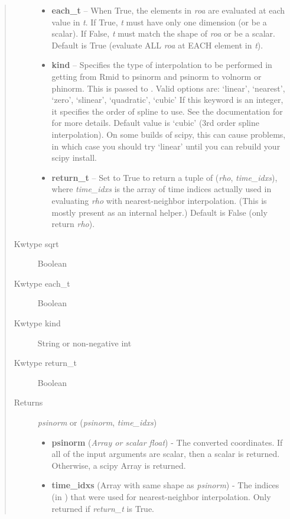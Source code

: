 \documentclass[letterpaper,10pt,english]{sphinxmanual}
\begin{document}
\begin{fulllineitems}
\begin{fulllineitems}
\begin{quote}
\begin{description}
\begin{itemize}
\item {} 
\textbf{each\_t} -- When True, the elements in \emph{roa} are evaluated
at each value in \emph{t}. If True, \emph{t} must have only one dimension
(or be a scalar). If False, \emph{t} must match the shape of \emph{roa}
or be a scalar. Default is True (evaluate ALL \emph{roa} at EACH
element in \emph{t}).

\item {} 
\textbf{kind} -- Specifies the type of
interpolation to be performed in getting from Rmid to
psinorm and psinorm to volnorm or phinorm. This is passed to
. Valid options are:
`linear', `nearest', `zero', `slinear', `quadratic', `cubic'
If this keyword is an integer, it specifies the order of spline
to use. See the documentation for  for more
details. Default value is `cubic' (3rd order spline
interpolation). On some builds of scipy, this can cause problems,
in which case you should try `linear' until you can rebuild your
scipy install.

\item {} 
\textbf{return\_t} -- Set to True to return a tuple of (\emph{rho},
\emph{time\_idxs}), where \emph{time\_idxs} is the array of time indices
actually used in evaluating \emph{rho} with nearest-neighbor
interpolation. (This is mostly present as an internal helper.)
Default is False (only return \emph{rho}).

\end{itemize}

\item[{Kwtype sqrt}] \leavevmode
Boolean

\item[{Kwtype each\_t}] \leavevmode
Boolean

\item[{Kwtype kind}] \leavevmode
String or non-negative int

\item[{Kwtype return\_t}] \leavevmode
Boolean

\item[{Returns}] \leavevmode

\emph{psinorm} or (\emph{psinorm}, \emph{time\_idxs})
\begin{itemize}
\item {} 
\textbf{psinorm} (\emph{Array or scalar float}) - The converted coordinates. If
all of the input arguments are scalar, then a scalar is returned.
Otherwise, a scipy Array is returned.

\item {} 
\textbf{time\_idxs} (Array with same shape as \emph{psinorm}) - The indices
(in ) that were used for
nearest-neighbor interpolation. Only returned if \emph{return\_t} is
True.


\end{itemize}
\end{description}
\end{quote}
\end{fulllineitems}
\end{fulllineitems}
\end{document}
